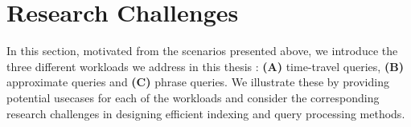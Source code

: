 


\section{Research Challenges}
 In this section, motivated from the scenarios presented above, we introduce the three different workloads we address in this thesis : \textbf{(A)} time-travel queries, \textbf{(B)} approximate queries and \textbf{(C)} phrase queries. We illustrate these by providing potential usecases for each of the workloads and consider the corresponding research challenges in designing efficient indexing and query processing methods. 

